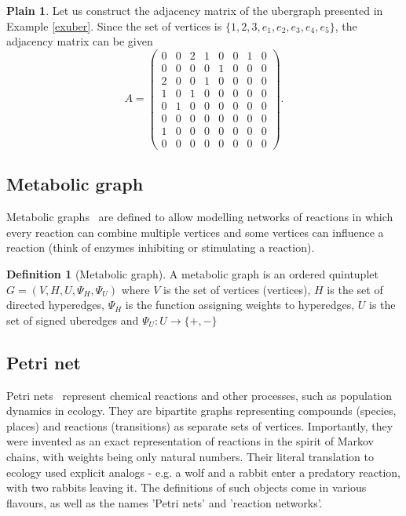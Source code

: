 \documentclass[a4paper,12pt]{article}
\theoremstyle{definition}
\newtheorem{definition}{Definition}%
\newtheorem{plain}{Plain}%
\theoremstyle{remark}
\begin{document}
\begin{plain}
    Let us construct the adjacency matrix of the ubergraph presented in Example \ref{exuber}. Since the set of vertices is $ \{ 1,2,3, e_1 , e_2 , e_3, e_4 , e_5 \} $, the adjacency matrix can be given
    \begin{equation*}
        A=\begin{pmatrix}
    0 & 0 & 2 & 1 &0 & 0 & 1 & 0 \\
     0 & 0 & 0 & 0 &1 & 0 & 0 & 0 \\
     2 & 0 & 0 & 1 &0 & 0 & 0 & 0 \\
     1 & 0 & 1 & 0 &0 & 0 & 0 & 0 \\
     0 & 1 & 0 & 0 &0 & 0 & 0 & 0 \\
      0 & 0 & 0 & 0 &0 & 0 & 0 & 0 \\
      1 & 0 & 0 & 0 &0 & 0 & 0 & 0 \\
     0 & 0 & 0 & 0 &0 & 0 & 0 & 0
    \end{pmatrix}.
    \end{equation*}
\end{plain}


\subsection{Metabolic graph}
 Metabolic graphs~\cite{metabolic_network} are defined to allow modelling networks of reactions in which every reaction can combine multiple vertices and some vertices can influence a reaction (think of enzymes inhibiting or stimulating a reaction).
 
\begin{definition}[Metabolic graph]
A metabolic graph is an ordered quintuplet $G=(V, H, U, \Psi_H, \Psi_U)$ where $V$ is the set of vertices (vertices), $H$ is the set of directed hyperedges, $\Psi_H$ is the function assigning weights to hyperedges, $U$ is the set of signed uberedges and $\Psi_U: U \rightarrow \{+,-\}$
\end{definition}

\subsection{Petri net}
Petri nets~\cite{Petri_thesis, Petri_Peterson_book} represent chemical reactions and other processes, such as population dynamics in ecology. They are bipartite graphs representing compounds (species, places) and reactions (transitions) as separate sets of vertices. Importantly, they were invented as an exact representation of reactions in the spirit of Markov chains, with weights being only natural numbers. Their literal translation to ecology used explicit analogs - e.g. a wolf and a rabbit enter a predatory reaction, with two rabbits leaving it. The definitions of such objects come in various flavours, as well as the names 'Petri nets' and 'reaction networks'. 
\end{document}
